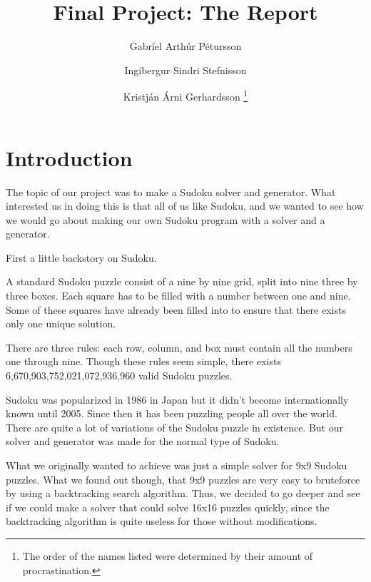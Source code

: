 \documentclass[12pt,a4paper]{article}
\title{Final Project: The Report}
\author{Gabríel Arthúr Pétursson \and Ingibergur Sindri Stefnisson \and Kristján Árni Gerhardsson
	\footnote{The order of the names listed were determined by their amount of procrastination.}}
\begin{document}
\maketitle

\clearpage


\section*{Introduction}

The topic of our project was to make a Sudoku solver and generator. What interested
us in doing this is that all of us like Sudoku, and we wanted to see how we would
go about making our own Sudoku program with a solver and a generator.

First a little backstory on Sudoku.

A standard Sudoku puzzle consist of a nine by nine grid, split into nine three
by three boxes. Each square has to be filled with a number between one and nine.
Some of these squares have already been filled into to ensure that there exists
only one unique solution.

There are three rules: each row, column, and box must contain all the numbers
one through nine. Though these rules seem simple, there exists
6,670,903,752,021,072,936,960 valid Sudoku puzzles.

Sudoku was popularized in 1986 in Japan but it didn't become internationally known
until 2005. Since then it has been puzzling people all over the world.
There are quite a lot of variations of the Sudoku puzzle in existence. But our 
solver and generator was made for the normal type of Sudoku.

What we originally wanted to achieve was just a simple solver for 9x9 Sudoku puzzles.
What we found out though, that 9x9 puzzles are very easy to bruteforce by using
a backtracking search algorithm. Thus, we decided to go deeper and see if we could
make a solver that could solve 16x16 puzzles quickly, since the backtracking algorithm
is quite useless for those without modifications.
\end{document}
